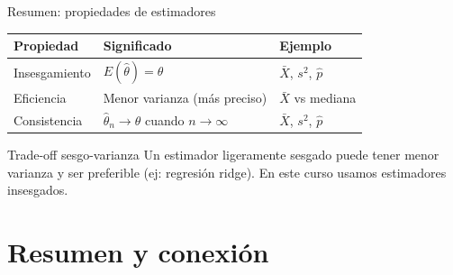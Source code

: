 \documentclass[aspectratio=169, 11pt]{beamer}
\begin{document}
\begin{frame}{Resumen: propiedades de estimadores}
{\small
\begin{table}
\centering
\begin{tabular}{lp{5cm}l}
\toprule
\textbf{Propiedad} & \textbf{Significado} & \textbf{Ejemplo} \\
\midrule
Insesgamiento & $E(\hat{\theta}) = \theta$ & $\bar{X}$, $s^2$, $\hat{p}$ \\
Eficiencia & Menor varianza (más preciso) & $\bar{X}$ vs mediana \\
Consistencia & $\hat{\theta}_n \to \theta$ cuando $n\to\infty$ & $\bar{X}$, $s^2$, $\hat{p}$ \\
\bottomrule
\end{tabular}
\end{table}
}

\begin{alertblock}{Trade-off sesgo-varianza}
Un estimador ligeramente sesgado puede tener menor varianza y ser preferible (ej: regresión ridge). En este curso usamos estimadores insesgados.
\end{alertblock}
\end{frame}

\section{Resumen y conexión}
\end{document}
